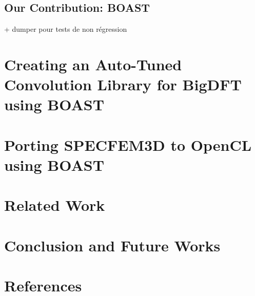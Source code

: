 \documentclass[review]{elsarticle}
\begin{document}
  \subsection{Our Contribution: BOAST}
  \cite{videau2013boast}
     + dumper pour tests de non régression


\section{Creating an Auto-Tuned Convolution Library for BigDFT using BOAST}



\section{Porting SPECFEM3D to OpenCL using BOAST}



\section{Related Work}



\section{Conclusion and Future Works}


\section*{References}


\end{document}
